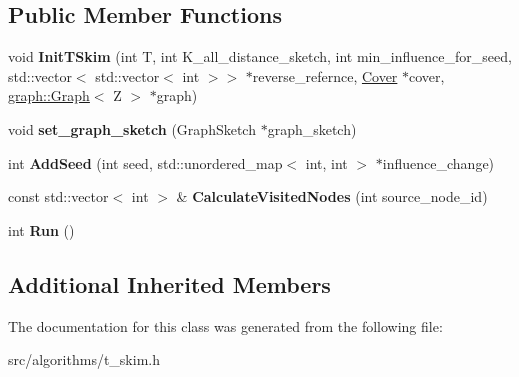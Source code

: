 \subsection*{Public Member Functions}
\begin{DoxyCompactItemize}
\item 
\hypertarget{classall__distance__sketch_1_1TSkimApproxSeedExactCover_afe7ab2b5a9948662189906df1f8a983e}{}void {\bfseries Init\+T\+Skim} (int T, int K\+\_\+all\+\_\+distance\+\_\+sketch, int min\+\_\+influence\+\_\+for\+\_\+seed, std\+::vector$<$ std\+::vector$<$ int $>$$>$ $\ast$reverse\+\_\+refernce, \hyperlink{classall__distance__sketch_1_1Cover}{Cover} $\ast$cover, \hyperlink{classall__distance__sketch_1_1graph_1_1Graph}{graph\+::\+Graph}$<$ Z $>$ $\ast$graph)\label{classall__distance__sketch_1_1TSkimApproxSeedExactCover_afe7ab2b5a9948662189906df1f8a983e}

\item 
\hypertarget{classall__distance__sketch_1_1TSkimApproxSeedExactCover_a99664bf9d3fa4f01d98ba8ae164cf856}{}void {\bfseries set\+\_\+graph\+\_\+sketch} (Graph\+Sketch $\ast$graph\+\_\+sketch)\label{classall__distance__sketch_1_1TSkimApproxSeedExactCover_a99664bf9d3fa4f01d98ba8ae164cf856}

\item 
\hypertarget{classall__distance__sketch_1_1TSkimApproxSeedExactCover_ad2e921dad0e26739bed1f8bdd992cf15}{}int {\bfseries Add\+Seed} (int seed, std\+::unordered\+\_\+map$<$ int, int $>$ $\ast$influence\+\_\+change)\label{classall__distance__sketch_1_1TSkimApproxSeedExactCover_ad2e921dad0e26739bed1f8bdd992cf15}

\item 
\hypertarget{classall__distance__sketch_1_1TSkimApproxSeedExactCover_a2f792c65bfcf4150918b5ba76cab057b}{}const std\+::vector$<$ int $>$ \& {\bfseries Calculate\+Visited\+Nodes} (int source\+\_\+node\+\_\+id)\label{classall__distance__sketch_1_1TSkimApproxSeedExactCover_a2f792c65bfcf4150918b5ba76cab057b}

\item 
\hypertarget{classall__distance__sketch_1_1TSkimApproxSeedExactCover_a1532c6d3ed01ec7dedc450bb293bfb02}{}int {\bfseries Run} ()\label{classall__distance__sketch_1_1TSkimApproxSeedExactCover_a1532c6d3ed01ec7dedc450bb293bfb02}

\end{DoxyCompactItemize}
\subsection*{Additional Inherited Members}


The documentation for this class was generated from the following file\+:\begin{DoxyCompactItemize}
\item 
src/algorithms/t\+\_\+skim.\+h\end{DoxyCompactItemize}
